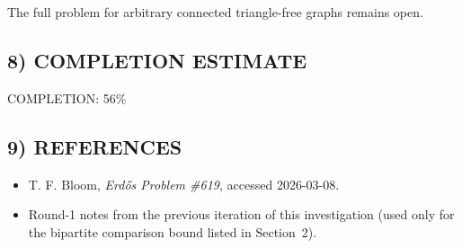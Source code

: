 The full problem for arbitrary connected triangle-free graphs remains open.

\subsection*{8) COMPLETION ESTIMATE}

COMPLETION: 56\%

\subsection*{9) REFERENCES}

\begin{itemize}
\item T. F. Bloom, \emph{Erd\H{o}s Problem \#619}, accessed 2026-03-08.
\item Round-1 notes from the previous iteration of this investigation (used only for the bipartite comparison bound listed in Section~2).
\end{itemize}

